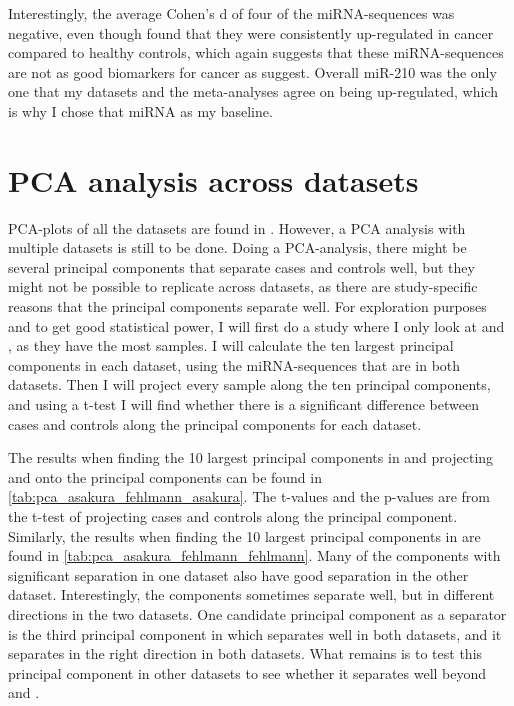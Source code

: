 {{{{{Interestingly, the average Cohen's d of four of the miRNA-sequences was negative, even though \citet{mirna_replicate_sequences} found that they were consistently up-regulated in cancer compared to healthy controls, which again suggests that these miRNA-sequences are not as good biomarkers for cancer as \citet{mirna_replicate_sequences} suggest. Overall miR-210 was the only one that my datasets and the meta-analyses agree on being up-regulated, which is why I chose that miRNA as my baseline. 

\section{PCA analysis across datasets}
\label{sec:res_pca_analysis}
PCA-plots of all the datasets are found in \citet{forprosjekt}. However, a PCA analysis with multiple datasets is still to be done. Doing a PCA-analysis, there might be several principal components that separate cases and controls well, but they might not be possible to replicate across datasets, as there are study-specific reasons that the principal components separate well. For exploration purposes and to get good statistical power, I will first do a study where I only look at \citet{Asakura2020} and \citet{Fehlmann2020}, as they have the most samples. I will calculate the ten largest principal components in each dataset, using the miRNA-sequences that are in both datasets. Then I will project every sample along the ten principal components, and using a t-test I will find whether there is a significant difference between cases and controls along the principal components for each dataset.

The results when finding the 10 largest principal components in \citet{Asakura2020} and projecting \citet{Asakura2020} and \citet{Fehlmann2020} onto the principal components can be found in \autoref{tab:pca_asakura_fehlmann_asakura}. The t-values and the p-values are from the t-test of projecting cases and controls along the principal component. Similarly, the results when finding the 10 largest principal components in \citet{Fehlmann2020} are found in \autoref{tab:pca_asakura_fehlmann_fehlmann}. Many of the components with significant separation in one dataset also have good separation in the other dataset. Interestingly, the components sometimes separate well, but in different directions in the two datasets. One candidate principal component as a separator is the third principal component in \citet{Asakura2020} which separates well in both datasets, and it separates in the right direction in both datasets. What remains is to test this principal component in other datasets to see whether it separates well beyond \citet{Asakura2020} and \citet{Fehlmann2020}.

}}}}}
